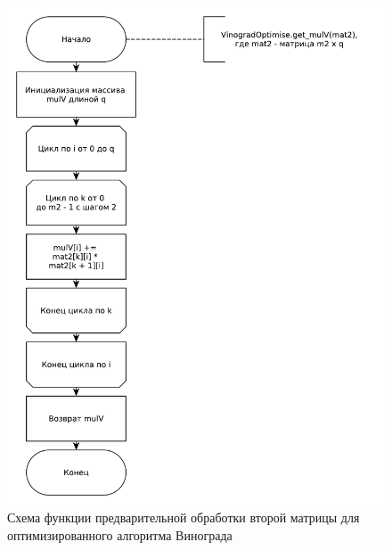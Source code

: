 \documentclass[a4paper,oneside,14pt]{extreport}
\begin{document}
\begin{figure}[H]
	\centering
	\includegraphics[width=0.9\linewidth]{images/vinogradOptimise_get_mulv}
	\caption{Схема функции предварительной обработки второй матрицы для оптимизированного алгоритма Винограда}
	\label{fig:opt_vin_mulv}
\end{figure}
\end{document}
